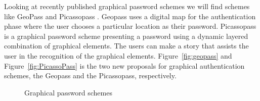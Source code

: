   Looking at recently published graphical password schemes we will find schemes like GeoPass \cite{GeoPass} and Picassopass \cite{PicassoPass}. Geopass uses a digital map for the authentication phase where the user chooses a particular location as their password. Picassopass is a graphical password scheme presenting a password using a dynamic layered combination of graphical elements. The users can make a story that assists the user in the recognition of the graphical elements. Figure~\ref{fig:geopass} and Figure~\ref{fig:PicassoPass} is the two new proposals for graphical authentication schemes, the Geopass and the Picassopass, respectively. 

    \begin{figure}[H]
      \centering
      \caption{Graphical password schemes}
    \end{figure}
  